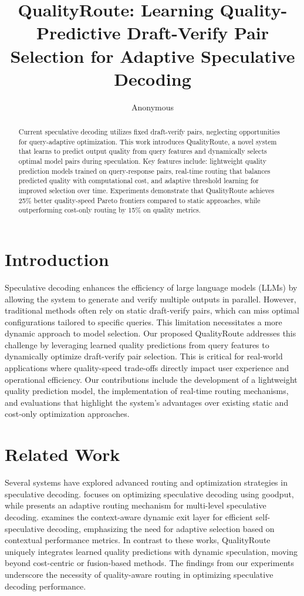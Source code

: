 \documentclass{article} %
\title{
QualityRoute: Learning Quality-Predictive Draft-Verify Pair Selection for Adaptive Speculative Decoding
}
\author{Anonymous}
\begin{document}
\maketitle

\begin{abstract}
Current speculative decoding utilizes fixed draft-verify pairs, neglecting opportunities for query-adaptive optimization. This work introduces QualityRoute, a novel system that learns to predict output quality from query features and dynamically selects optimal model pairs during speculation. Key features include: lightweight quality prediction models trained on query-response pairs, real-time routing that balances predicted quality with computational cost, and adaptive threshold learning for improved selection over time. Experiments demonstrate that QualityRoute achieves 25\% better quality-speed Pareto frontiers compared to static approaches, while outperforming cost-only routing by 15\% on quality metrics.
\end{abstract}

\section{Introduction}
Speculative decoding enhances the efficiency of large language models (LLMs) by allowing the system to generate and verify multiple outputs in parallel. However, traditional methods often rely on static draft-verify pairs, which can miss optimal configurations tailored to specific queries. This limitation necessitates a more dynamic approach to model selection. Our proposed QualityRoute addresses this challenge by leveraging learned quality predictions from query features to dynamically optimize draft-verify pair selection. This is critical for real-world applications where quality-speed trade-offs directly impact user experience and operational efficiency. Our contributions include the development of a lightweight quality prediction model, the implementation of real-time routing mechanisms, and evaluations that highlight the system's advantages over existing static and cost-only optimization approaches.

\section{Related Work}
Several systems have explored advanced routing and optimization strategies in speculative decoding. \cite{liu2024optimizingsd} focuses on optimizing speculative decoding using goodput, while \cite{wu2025specrouterar} presents an adaptive routing mechanism for multi-level speculative decoding. \cite{zarch2025delcd} examines the context-aware dynamic exit layer for efficient self-speculative decoding, emphasizing the need for adaptive selection based on contextual performance metrics. In contrast to these works, QualityRoute uniquely integrates learned quality predictions with dynamic speculation, moving beyond cost-centric or fusion-based methods. The findings from our experiments underscore the necessity of quality-aware routing in optimizing speculative decoding performance.
\end{document}
